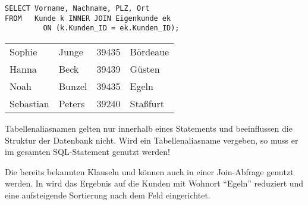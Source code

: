         \begin{lstlisting}[language=oracle_sql,caption={Die Benutzung von Tabellenaliasnamen},label=sql04_04]
SELECT Vorname, Nachname, PLZ, Ort
FROM   Kunde k INNER JOIN Eigenkunde ek
         ON (k.Kunden_ID = ek.Kunden_ID);
        \end{lstlisting}
        \begin{center}
          \begin{small}
            \tablehead{}
            \begin{msoraclesql}
              \begin{supertabular}{llll}
                Sophie & Junge & 39435 & Bördeaue \\
                Hanna & Beck & 39439 & Güsten \\
                Noah & Bunzel & 39435 & Egeln \\
                Sebastian & Peters & 39240 & Staßfurt \\
              \end{supertabular}
            \end{msoraclesql}
          \end{small}
        \end{center}
        \begin{merke}
          Tabellenaliasnamen gelten nur innerhalb eines Statements und beeinflussen die Struktur der Datenbank nicht. Wird ein Tabellenaliasname vergeben, so muss er im gesamten SQL-Statement genutzt werden!
        \end{merke}
        Die bereits bekannten Klauseln  und  können auch in einer Join-Abfrage genutzt werden. In  wird das Ergebnis auf die Kunden mit Wohnort \enquote{Egeln} reduziert und eine aufsteigende Sortierung nach dem Feld  eingerichtet.
